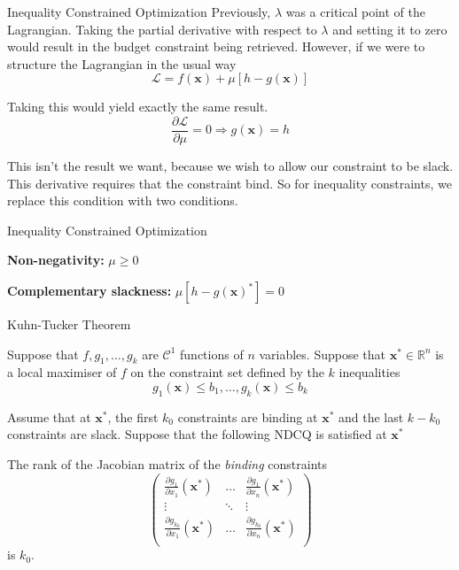 \documentclass[11pt, xcolor={dvipsnames}, hyperref={colorlinks, allcolors=Blue}]{beamer}
\newcommand\bc[1]{{\usebeamercolor[fg]{frametitle} {\textbf{#1}}}} %
\newcommand{\R}{\mathbb{R}}
\renewcommand{\implies}{\Rightarrow}
\newcommand{\x}{\mathbf{x}}
\begin{document}
\begin{frame}{Inequality Constrained Optimization}
Previously, $\lambda$ was a critical point of the Lagrangian. Taking the partial derivative with respect to $\lambda$ and setting it to zero would result in the budget constraint being retrieved. However, if we were to structure the Lagrangian in the usual way
\[\mathcal{L} = f(\x) + \mu \left [h - g(\x)\right ]\]

Taking this would yield exactly the same result.
\[\frac{\partial \mathcal{L}}{\partial \mu} = 0 \implies g(\x) = h\]

This isn't the result we want, because we wish to allow our constraint to be slack. This derivative requires that the constraint bind. So for inequality constraints, we replace this condition with two conditions.\\
\end{frame}

\begin{frame}{Inequality Constrained Optimization}

\vfill\vfill\bigskip \vfill
\bc{Non-negativity:} $\mu\geq 0$ \smallskip

\bc{Complementary slackness:} $\mu [h-g(\x)^{*}] = 0$

\end{frame}


\begin{frame}{Kuhn-Tucker Theorem}

\begin{theorem}
Suppose that $f,g_{1},\dots,g_{k}$ are $\mathcal{C}^{1}$ functions of $n$ variables. Suppose that $\x^{*}\in \R^{n}$ is a local maximiser of $f$ on the constraint set defined by the $k$ inequalities
\[g_{1}(\x)\leq b_{1},\dots, g_{k}(\x) \leq b_{k}\]

Assume that at $\x^{*}$, the first $k_0$ constraints are binding at $\x^{*}$ and the last $k-k_{0}$ constraints are slack. Suppose that the following NDCQ is satisfied at $\x^{*}$

The rank of the Jacobian matrix of the \emph{binding} constraints 
\[
\begin{pmatrix}
\frac{\partial g_{1}}{\partial x_{1}}(\x^{*})  &  \dots &  \frac{\partial g_{1}}{\partial x_{n}}(\x^{*})\\
\vdots & \ddots & \vdots\\
\frac{\partial g_{k_{0}}}{\partial x_{1}}(\x^{*}) & \dots & \frac{\partial g_{k_{0}}}{\partial x_{n}}(\x^{*})\\
\end{pmatrix}
\]
is $k_{0}$. 
\end{theorem}

\vfill\vfill
\end{frame}
\end{document}
